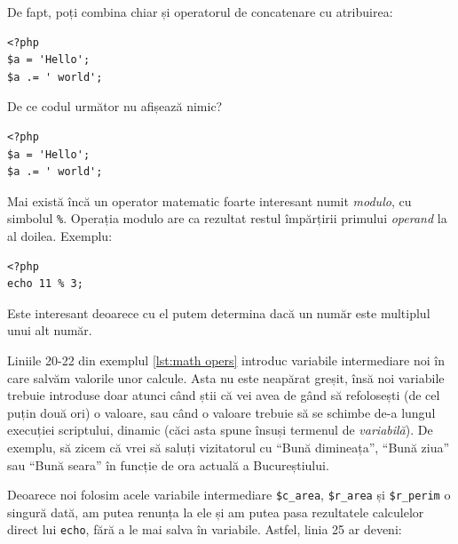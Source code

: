 De fapt, poți combina chiar și operatorul de concatenare
cu atribuirea:
\begin{lstlisting}
<?php
$a = 'Hello';
$a .= ' world';
\end{lstlisting}

\begin{Exercise}[title={Lipsă output}]
De ce codul următor nu afișează nimic?
\begin{lstlisting}
<?php
$a = 'Hello';
$a .= ' world';
\end{lstlisting}
\end{Exercise}

\label{term:modulo}
Mai există încă un operator matematic foarte interesant numit \textsl{modulo},
cu simbolul \texttt{\%}. Operația modulo are ca rezultat restul
împărțirii primului \textsl{operand} la al doilea. Exemplu:
\begin{lstlisting}
<?php
echo 11 % 3;
\end{lstlisting}
Este interesant deoarece cu el putem determina dacă un număr este multiplul
unui alt număr.


Liniile 20-22 din exemplul \ref{lst:math opers}
introduc variabile intermediare noi în care
salvăm valorile unor calcule. Asta nu este neapărat greșit,
însă noi variabile trebuie introduse doar atunci când
știi că vei avea de gând să refolosești (de cel puțin
două ori) o valoare, sau când o valoare trebuie să
se schimbe de-a lungul execuției scriptului, dinamic
(căci asta spune însuși termenul de \textit{variabilă}).
De exemplu, să zicem că vrei să saluți vizitatorul
cu ``Bună dimineața'', ``Bună ziua'' sau ``Bună seara''
în funcție de ora actuală a Bucureștiului.

Deoarece noi folosim acele variabile intermediare
\texttt{\$c\_area}, \texttt{\$r\_area} și \texttt{\$r\_perim} o singură dată, am
putea renunța la ele și am putea pasa rezultatele
calculelor direct lui \texttt{echo},
fără a le mai salva în variabile. Astfel, linia 25
ar deveni:



